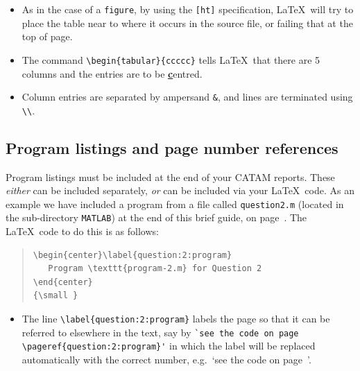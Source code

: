 \begin{itemize}
\item As in the case of a \texttt{figure}, by using the \texttt{[ht]}
  specification, \LaTeX\ will try to place the table near to where it
  occurs in the source file, or failing that at the top of page.
\item The command \verb|\begin{tabular}{ccccc}| tells \LaTeX\ that
  there are 5 columns and the entries are to be \underline{\bf c}entred.
\item Column entries are separated by ampersand \texttt{\&}, and lines
  are terminated using \verb|\\|.
\end{itemize}

\subsection{Program listings and page number references}\label{proglist}

Program listings must be included at the end of your CATAM
reports. These \textsl{either} can be included separately, \textit{or}
can be included via your \LaTeX\ code. As an example we have included
a program from a file called \texttt{question2.m} (located in the
sub-directory \texttt{MATLAB}) at the end of this
brief guide, on page~\pageref{question:2:program}.  The \LaTeX\ code
to do this is as follows:
\begin{quote}
\begin{verbatim}
\begin{center}\label{question:2:program}
   Program \texttt{program-2.m} for Question 2
\end{center}
{\small }
\end{verbatim}
\end{quote}
\begin{itemize}
\item The line \verb|\label{question:2:program}| labels the page so
  that it can be referred to elsewhere in the text, say by
  \verb|`see the code on page \pageref{question:2:program}'| in which
  the label will be replaced automatically with the correct number,
  e.g.\ `see the code on page~\pageref{question:2:program}'.
\end{itemize}


